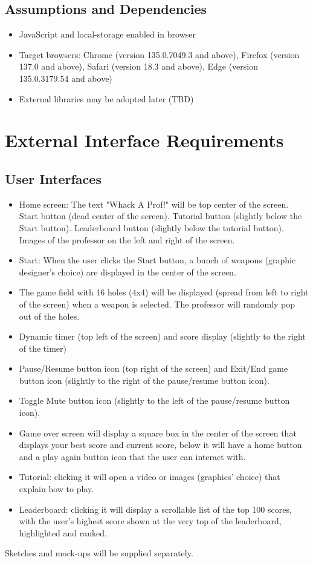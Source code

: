 \documentclass[11pt]{scrreprt}
\begin{document}
\section{Assumptions and Dependencies}
\begin{itemize}
  \item JavaScript and local-storage enabled in browser
  \item Target browsers: Chrome (version 135.0.7049.3 and above), Firefox (version 137.0 and above), Safari (version 18.3 and above), Edge (version 135.0.3179.54 and above)
  \item External libraries may be adopted later (TBD)
\end{itemize}

\chapter{External Interface Requirements}

\section{User Interfaces}
\begin{itemize}
  \item Home screen: {The text "Whack A Prof!" will be top center of the screen.} {Start{ button (dead center of the screen).} Tutorial button (slightly below the Start button).} {Leaderboard button (slightly below the tutorial button).} {Images of the professor on the left and right of the screen.}
  \item Start: When the user clicks the Start button, a bunch of weapons (graphic designer's choice) are displayed in the center of the screen. 
  \item The game field with 16 holes (4x4) will be displayed (spread from left to right of the screen) when a weapon is selected. The professor will randomly pop out of the holes.
  \item Dynamic timer (top left of the screen) and score display (slightly to the right of the timer)
  \item Pause/Resume button icon (top right of the screen) and Exit/End game button icon (slightly to the right of the pause/resume button icon).
  \item Toggle Mute button icon (slightly to the left of the pause/resume button icon).
  \item Game over screen will display a square box in the center of the screen that displays your best score and current score, below it will have a home button and a play again button icon that the user can interact with.
  \item Tutorial: clicking it will open a video or images (graphics' choice) that explain how to play.
  \item Leaderboard: clicking it will display a scrollable list of the top 100 scores, with the user's highest score shown at the very top of the leaderboard, highlighted and ranked.
\end{itemize}
Sketches and mock-ups will be supplied separately.
\end{document}
